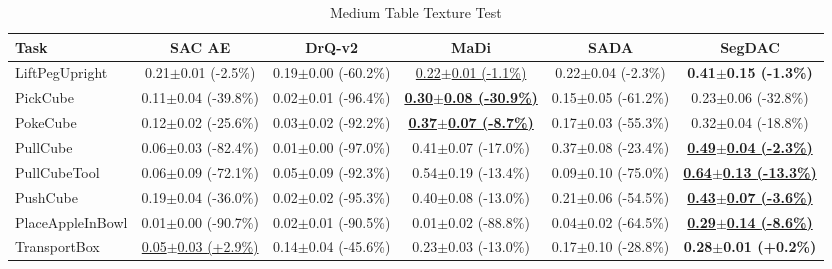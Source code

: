 \begin{table}[htbp]
\centering
\scriptsize
\caption{Medium Table Texture Test}
\label{tab:appendix_tabletexturetest_medium}
\begin{adjustbox}{max width=\textwidth}
\begin{tabular}{l*{5}{c}}
\toprule
\textbf{Task} & \textbf{SAC AE} & \textbf{DrQ-v2} & \textbf{MaDi} & \textbf{SADA} & \textbf{SegDAC} \\
\midrule
LiftPegUpright & 0.21$\pm$0.01 \scriptsize{(-2.5\%)} & 0.19$\pm$0.00 \scriptsize{(-60.2\%)} & \underline{0.22$\pm$0.01 \scriptsize{(-1.1\%)}} & 0.22$\pm$0.04 \scriptsize{(-2.3\%)} & \textbf{0.41$\pm$0.15 \scriptsize{(-1.3\%)}} \\
PickCube & 0.11$\pm$0.04 \scriptsize{(-39.8\%)} & 0.02$\pm$0.01 \scriptsize{(-96.4\%)} & \textbf{\underline{0.30$\pm$0.08 \scriptsize{(-30.9\%)}}} & 0.15$\pm$0.05 \scriptsize{(-61.2\%)} & 0.23$\pm$0.06 \scriptsize{(-32.8\%)} \\
PokeCube & 0.12$\pm$0.02 \scriptsize{(-25.6\%)} & 0.03$\pm$0.02 \scriptsize{(-92.2\%)} & \textbf{\underline{0.37$\pm$0.07 \scriptsize{(-8.7\%)}}} & 0.17$\pm$0.03 \scriptsize{(-55.3\%)} & 0.32$\pm$0.04 \scriptsize{(-18.8\%)} \\
PullCube & 0.06$\pm$0.03 \scriptsize{(-82.4\%)} & 0.01$\pm$0.00 \scriptsize{(-97.0\%)} & 0.41$\pm$0.07 \scriptsize{(-17.0\%)} & 0.37$\pm$0.08 \scriptsize{(-23.4\%)} & \textbf{\underline{0.49$\pm$0.04 \scriptsize{(-2.3\%)}}} \\
PullCubeTool & 0.06$\pm$0.09 \scriptsize{(-72.1\%)} & 0.05$\pm$0.09 \scriptsize{(-92.3\%)} & 0.54$\pm$0.19 \scriptsize{(-13.4\%)} & 0.09$\pm$0.10 \scriptsize{(-75.0\%)} & \textbf{\underline{0.64$\pm$0.13 \scriptsize{(-13.3\%)}}} \\
PushCube & 0.19$\pm$0.04 \scriptsize{(-36.0\%)} & 0.02$\pm$0.02 \scriptsize{(-95.3\%)} & 0.40$\pm$0.08 \scriptsize{(-13.0\%)} & 0.21$\pm$0.06 \scriptsize{(-54.5\%)} & \textbf{\underline{0.43$\pm$0.07 \scriptsize{(-3.6\%)}}} \\
PlaceAppleInBowl & 0.01$\pm$0.00 \scriptsize{(-90.7\%)} & 0.02$\pm$0.01 \scriptsize{(-90.5\%)} & 0.01$\pm$0.02 \scriptsize{(-88.8\%)} & 0.04$\pm$0.02 \scriptsize{(-64.5\%)} & \textbf{\underline{0.29$\pm$0.14 \scriptsize{(-8.6\%)}}} \\
TransportBox & \underline{0.05$\pm$0.03 \scriptsize{(+2.9\%)}} & 0.14$\pm$0.04 \scriptsize{(-45.6\%)} & 0.23$\pm$0.03 \scriptsize{(-13.0\%)} & 0.17$\pm$0.10 \scriptsize{(-28.8\%)} & \textbf{0.28$\pm$0.01 \scriptsize{(+0.2\%)}} \\
\bottomrule
\end{tabular}
\end{adjustbox}
\end{table}

